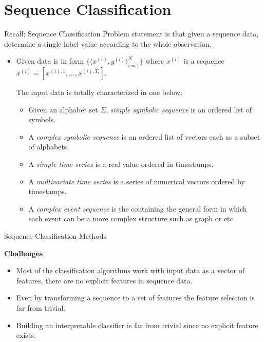 \documentclass{beamer}
\begin{document}
\section{Sequence Classification}
	\begin{frame}{Recall; Sequence Classification}
		Problem statement is that given a sequence data, determine a single label value according to the whole observation. \begin{itemize}
			\item Given data is in form  $\{ \langle x^{(i)},y^{(i)} \rangle_{i = 1}^{N} \}$ where $x^{(i)}$ is a sequence $x^{(i)} = [x^{(i) , 1} , ... , x^{(i), T_i}]$.
			
			\pause
			The input data is totally characterized in one below;
			\begin{itemize}[<+->]
				\item Given an alphabet set $\Sigma$, \alert{\textit{simple symbolic sequence}} is an ordered list of symbols. 
				\item A \alert{\textit{complex symbolic sequence}} is an ordered list of vectors each as a subset of alphabets.
				\item A \alert{\textit{simple time series} }is a real value ordered in timestamps.
				\item A \alert{\textit{multivariate time series}} is a series of numerical vectors ordered by timestamps.
				\item A \alert{\textit{complex event sequence}} is the containing the general form in which each event can be a more complex structure such as graph or etc.
			\end{itemize}
		\end{itemize}
	\end{frame}
	
	\begin{frame}{Sequence Classification Methods}
		\begin{center}
			\textbf{Challenges}
		\end{center}
		\begin{itemize}[<+->]
			\item Most of the classification algorithms work with input data as a vector of features, \alert{there are no explicit features in sequence data}.
			\item Even by transforming a sequence to a set of features \alert{the feature selection is far from trivial.}
			\item \alert{Building an interpretable classifier is far from trivial} since no explicit feature exists.
		\end{itemize}
		
	\end{frame}
\end{document}
